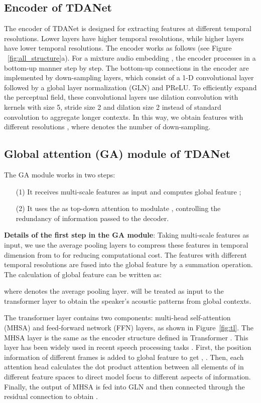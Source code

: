 \documentclass{article} \usepackage{iclr2023_conference,times}
\begin{document}
\subsection{Encoder of TDANet}
\label{sec:dbc}
The encoder of TDANet is designed for extracting features at different temporal resolutions.
Lower layers have higher temporal resolutions, while higher layers have lower temporal resolutions.  
The encoder works as follows (see Figure ~\ref{fig:all_structure}a). For a mixture audio embedding , the encoder processes  in a bottom-up manner step by step. The bottom-up connections in the encoder are implemented by down-sampling layers, which consist of a 1-D convolutional layer followed by a global layer normalization (GLN) \citep{luo2019conv} and PReLU. To efficiently expand the perceptual field, these convolutional layers use dilation convolution with  kernels with size 5, stride size 2 and dilation size 2 instead of standard convolution to aggregate longer contexts. In this way, we obtain features with different resolutions , where  denotes the number of down-sampling.

\subsection{Global attention (GA) module of TDANet}
\label{sec:sa}
The GA module works in two steps: 
\begin{enumerate}
    \item[(1)] It receives multi-scale features  as input and computes global feature ;
    \item[(2)] It uses the  as top-down attention to modulate , controlling the redundancy of information passed to the decoder.
\end{enumerate}

\textbf{Details of the first step in the GA module}: Taking multi-scale features  as input, we use the average pooling layers to compress these features in temporal dimension from  to  for reducing computational cost. The features with different temporal resolutions are fused into the global feature  by a summation operation. The calculation of global feature can be written as:

where  denotes the average pooling layer.  will be treated as input to the transformer layer to obtain the speaker's acoustic patterns from global contexts. 

The transformer layer contains two components: multi-head self-attention (MHSA) and feed-forward network (FFN) layers, as shown in Figure~\ref{fig:tl}. The MHSA layer is the same as the encoder structure defined in Transformer \citep{vaswani2017attention}. This layer has been widely used in recent speech processing tasks \citep{Chen2020, subakan2021attention, lam2021sandglasset}. First, the position information  of different frames is added to global feature  to get , . Then, each attention head calculates the dot product attention between all elements of  in different feature spaces to direct model focus to different aspects of information. Finally, the output  of MHSA is fed into GLN and then connected  through the residual connection to obtain .
\end{document}
